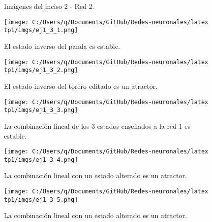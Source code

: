 \documentclass[11pt]{article} %
\begin{document}
\begin{figure}[p]
    \centering
    \\
    \\
    \caption{Imágenes del inciso 2 - Red 2.}
    \label{fig:ej2_b}
\end{figure}
\clearpage
\newpage

\begin{figure}[h!]
    \centering
    \texttt{[image: C:/Users/q/Documents/GitHub/Redes-neuronales/latex tp1/imgs/ej1\_3\_1.png]}
    \caption{El estado inverso del panda es estable.}
    \label{fig:ej1_3_1}
\end{figure}

\begin{figure}[h!]
    \centering
    \texttt{[image: C:/Users/q/Documents/GitHub/Redes-neuronales/latex tp1/imgs/ej1\_3\_2.png]}
    \caption{El estado inverso del torero editado es un atractor.}
    \label{fig:ej1_3_2}
\end{figure}

\begin{figure}[h!]
    \centering
    \texttt{[image: C:/Users/q/Documents/GitHub/Redes-neuronales/latex tp1/imgs/ej1\_3\_3.png]}
    \caption{La combinación lineal de los 3 estados enseñados a la red 1 es estable.}
    \label{fig:ej1_3_3}
\end{figure}

\begin{figure}[h!]
    \centering
    \texttt{[image: C:/Users/q/Documents/GitHub/Redes-neuronales/latex tp1/imgs/ej1\_3\_4.png]}
    \caption{La combinación lineal con un estado alterado es un atractor.}
    \label{fig:ej1_3_4}
\end{figure}

\begin{figure}[h!]
    \centering
    \texttt{[image: C:/Users/q/Documents/GitHub/Redes-neuronales/latex tp1/imgs/ej1\_3\_5.png]}
    \caption{La combinación lineal con un estado alterado es un atractor.}
    \label{fig:ej1_3_5}
\end{figure}
\clearpage
\newpage
\end{document}

